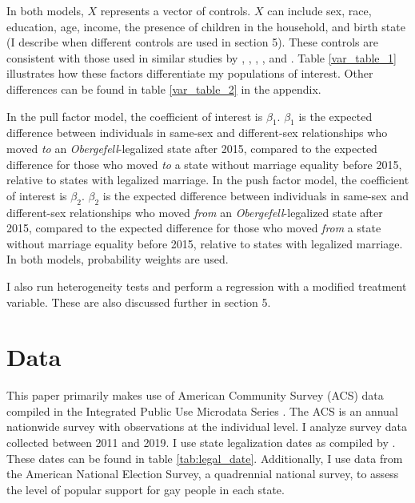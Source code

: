 \documentclass[12pt,letterpaper]{article}
\begin{document}
In both models, $X$ represents a vector of controls. $X$ can include sex, race, education, age, income, the presence of children in the household, and birth state (I describe when different controls are used in section 5). These controls are consistent with those used in similar studies by \citet{1}, \citet{3}, \citet{5}, \citet{7}, and \citet{12}. Table \ref{var_table_1} illustrates how these factors differentiate my populations of interest. Other differences can be found in table \ref{var_table_2} in the appendix.



In the pull factor model, the coefficient of interest is $\beta_1$. $\beta_1$ is the expected difference between individuals in same-sex and different-sex relationships who moved \textit{to} an \textit{Obergefell}-legalized state after 2015, compared to the expected difference for those who moved \textit{to} a state without marriage equality before 2015, relative to states with legalized marriage. In the push factor model, the coefficient of interest is $\beta_2$. $\beta_2$ is the expected difference between individuals in same-sex and different-sex relationships who moved \textit{from} an \textit{Obergefell}-legalized state after 2015, compared to the expected difference for those who moved \textit{from} a state without marriage equality before 2015, relative to states with legalized marriage. In both models, probability weights are used.

I also run heterogeneity tests and perform a regression with a modified treatment variable. These are also discussed further in section 5.

\section{Data}

This paper primarily makes use of American Community Survey (ACS) data compiled in the Integrated Public Use Microdata Series \citep{28}. The ACS is an annual nationwide survey with observations at the individual level. I analyze survey data collected between 2011 and 2019. I use state legalization dates as compiled by \citet{27}. These dates can be found in table \ref{tab:legal_date}. Additionally, I use data from the American National Election Survey, a quadrennial national survey, to assess the level of popular support for gay people in each state.


\end{document}
